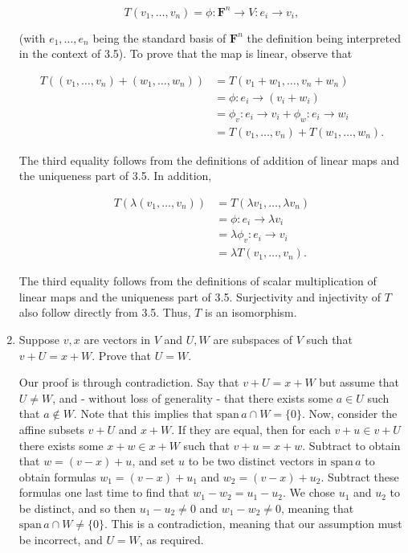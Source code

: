 \documentclass{book}
\begin{document}
\begin{enumerate}
\begin{equation*}
    T(v_1,\dots,v_n) = \phi: \textbf{F}^n \rightarrow V: e_i \rightarrow v_i,
\end{equation*}

(with \(e_1,\dots,e_n\) being the standard basis of \(\textbf{F}^n\) the definition being interpreted in the context of 3.5).  To prove that the map is linear, observe that

\begin{equation*}
    \begin{split}
        T((v_1,\dots,v_n)+(w_1,\dots,w_n)) &= T(v_1+w_1,\dots,v_n+w_n) \\
        &= \phi: e_i \rightarrow (v_i+w_i) \\
        &= \phi_v: e_i \rightarrow v_i + \phi_w: e_i \rightarrow w_i \\
        &= T(v_1,\dots,v_n) + T(w_1,\dots,w_n).
    \end{split}
\end{equation*}

The third equality follows from the definitions of addition of linear maps and the uniqueness part of 3.5.  In addition,

\begin{equation*}
    \begin{split}
        T(\lambda(v_1,\dots,v_n)) &= T(\lambda v_1,\dots,\lambda v_n) \\
        &= \phi: e_i \rightarrow \lambda v_i \\
        &= \lambda \phi_v: e_i \rightarrow v_i \\
        &= \lambda T(v_1,\dots,v_n).
    \end{split}
\end{equation*}

The third equality follows from the definitions of scalar multiplication of linear maps and the uniqueness part of 3.5.  Surjectivity and injectivity of \(T\) also follow directly from 3.5.  Thus, \(T\) is an isomorphism.


\item Suppose \(v,x\) are vectors in \(V\) and \(U,W\) are subspaces of \(V\) such that \(v+U=x+W\).  Prove that \(U=W\).

Our proof is through contradiction.  Say that \(v+U=x+W\) but assume that \(U \neq W\), and - without loss of generality - that there exists some \(a \in U\) such that \(a \notin W\).  Note that this implies that \(\textrm{span} \, a \cap W=\{0\}\).  Now, consider the affine subsets \(v+U\) and \(x+W\).  If they are equal, then for each \(v+u \in v+U\) there exists some \(x+w \in x+W\) such that \(v+u=x+w\).  Subtract to obtain that \(w=(v-x)+u\), and set \(u\) to be two distinct vectors in \(\textrm{span} \, a\) to obtain formulas \(w_1=(v-x)+u_1\) and \(w_2=(v-x)+u_2\).  Subtract these formulas one last time to find that \(w_1-w_2=u_1-u_2\).  We chose \(u_1\) and \(u_2\) to be distinct, and so then \(u_1-u_2 \neq 0\) and \(w_1-w_2 \neq 0\), meaning that \(\textrm{span} \, a \cap W \neq \{0\}\).  This is a contradiction, meaning that our assumption must be incorrect, and \(U=W\), as required.


\end{enumerate}
\end{document}
